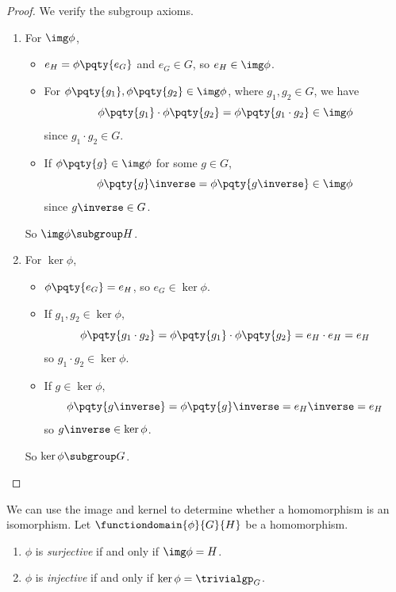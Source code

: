 \begin{proof}
    We verify the subgroup axioms.

    \begin{enumerate}
        \item For \(\img \phi\),
        \begin{itemize}
            \item \(e_H = \phi\pqty{e_G}\) and \(e_G \in G\), so \(e_H \in \img \phi\).
            \item For \(\phi\pqty{g_1}, \phi\pqty{g_2} \in \img \phi\), where \(g_1, g_2 \in G\), we have
            \[
                \phi\pqty{g_1} \cdot \phi\pqty{g_2} = \phi\pqty{g_1 \cdot g_2} \in \img \phi
            \]
            since \(g_1 \cdot g_2 \in G\).
            \item If \(\phi \pqty{g} \in \img \phi\) for some \(g \in G\),
            \[
                \phi\pqty{g}\inverse = \phi\pqty{g\inverse} \in \img \phi
            \]
            since \(g\inverse \in G\).
        \end{itemize}

        So \(\img \phi \subgroup H\).
        
        \item For \(\ker \phi\),
        \begin{itemize}
            \item \(\phi\pqty{e_G} = e_H\), so \(e_G \in \ker \phi\).
            \item If \(g_1, g_2 \in \ker \phi\),
            \[
                \phi\pqty{g_1 \cdot g_2} = \phi\pqty{g_1} \cdot \phi\pqty{g_2} = e_H \cdot e_H = e_H
            \]
            so \(g_1 \cdot g_2 \in \ker \phi\).
            \item If \(g \in \ker \phi\),
            \[
                \phi\pqty{g\inverse} = \phi\pqty{g}\inverse = e_H\inverse = e_H
            \]
            so \(g \inverse \in \ker \phi\).
        \end{itemize}

        So \(\ker \phi \subgroup G\).
    \end{enumerate}
\end{proof}

\begin{remarks}
    We can use the image and kernel to determine whether a homomorphism is an isomorphism. Let \(\functiondomain{\phi}{G}{H}\) be a homomorphism.
    \begin{enumerate}
        \item \(\phi\) is \emph{surjective} if and only if \(\img \phi = H\).
        \item \(\phi\) is \emph{injective} if and only if \(\ker \phi = \trivialgp_{G}\).
    \end{enumerate}
\end{remarks}

